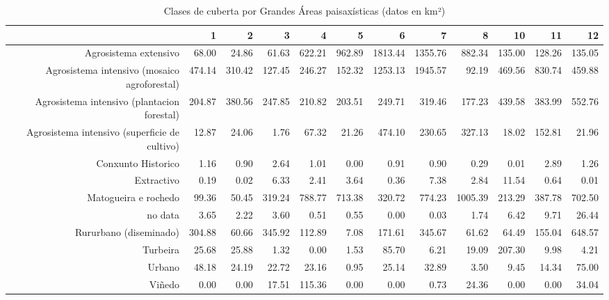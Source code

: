 \begin{table}[p]
\centering
\caption{Clases de cuberta por Grandes Áreas paisaxísticas (datos en km²)} 
\label{xtaboa2}
\begin{tabular}{rrrrrrrrrrrr}
  \hline
 & 1 & 2 & 3 & 4 & 5 & 6 & 7 & 8 & 10 & 11 & 12 \\ 
  \hline
Agrosistema extensivo & 68.00 & 24.86 & 61.63 & 622.21 & 962.89 & 1813.44 & 1355.76 & 882.34 & 135.00 & 128.26 & 135.05 \\ 
  Agrosistema intensivo (mosaico agroforestal) & 474.14 & 310.42 & 127.45 & 246.27 & 152.32 & 1253.13 & 1945.57 & 92.19 & 469.56 & 830.74 & 459.88 \\ 
  Agrosistema intensivo (plantacion forestal) & 204.87 & 380.56 & 247.85 & 210.82 & 203.51 & 249.71 & 319.46 & 177.23 & 439.58 & 383.99 & 552.76 \\ 
  Agrosistema intensivo (superficie de cultivo) & 12.87 & 24.06 & 1.76 & 67.32 & 21.26 & 474.10 & 230.65 & 327.13 & 18.02 & 152.81 & 21.96 \\ 
  Conxunto Historico & 1.16 & 0.90 & 2.64 & 1.01 & 0.00 & 0.91 & 0.90 & 0.29 & 0.01 & 2.89 & 1.26 \\ 
  Extractivo & 0.19 & 0.02 & 6.33 & 2.41 & 3.64 & 0.36 & 7.38 & 2.84 & 11.54 & 0.64 & 0.01 \\ 
  Matogueira e rochedo & 99.36 & 50.45 & 319.24 & 788.77 & 713.38 & 320.72 & 774.23 & 1005.39 & 213.29 & 387.78 & 702.50 \\ 
  no data & 3.65 & 2.22 & 3.60 & 0.51 & 0.55 & 0.00 & 0.03 & 1.74 & 6.42 & 9.71 & 26.44 \\ 
  Rururbano (diseminado) & 304.88 & 60.66 & 345.92 & 112.89 & 7.08 & 171.61 & 345.67 & 61.62 & 64.49 & 155.04 & 648.57 \\ 
  Turbeira & 25.68 & 25.88 & 1.32 & 0.00 & 1.53 & 85.70 & 6.21 & 19.09 & 207.30 & 9.98 & 4.21 \\ 
  Urbano & 48.18 & 24.19 & 22.72 & 23.16 & 0.95 & 25.14 & 32.89 & 3.50 & 9.45 & 14.34 & 75.00 \\ 
  Viñedo & 0.00 & 0.00 & 17.51 & 115.36 & 0.00 & 0.00 & 0.73 & 24.36 & 0.00 & 0.00 & 34.04 \\ 
   \hline
\end{tabular}
\end{table}
